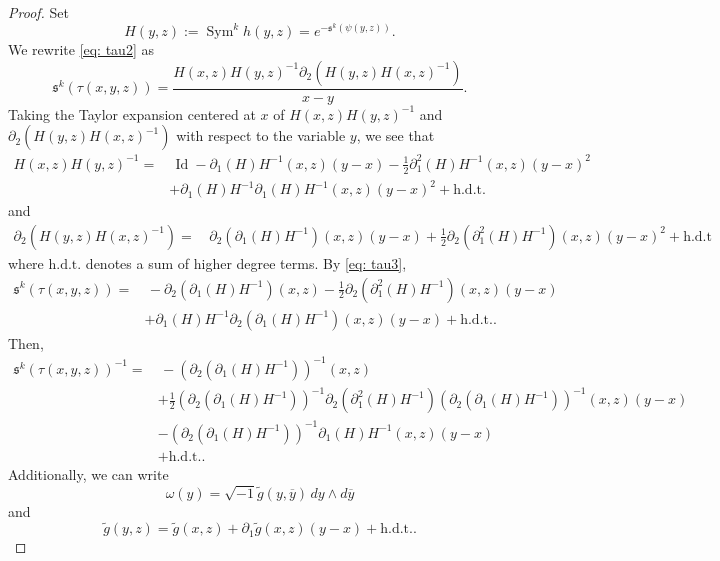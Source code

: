 \documentclass{amsart}
\theoremstyle{definition}
\theoremstyle{remark}
\numberwithin{equation}{section}
\DeclareMathOperator{\Sym}{Sym}
\DeclareMathOperator{\Id}{Id}
\begin{document}
\begin{proof}
Set 
$$
H(y,z) := \Sym^k h(y,z) = e^{-\mathfrak{s}^k(\psi(y,z))}.
$$
We rewrite \eqref{eq: tau2} as
\begin{equation} \label{eq: tau3}
\mathfrak{s}^k( \tau(x,y,z)) = \frac{H(x,z)H(y,z)^{-1} \partial_2 \left ( H(y,z) H(x,z)^{-1}\right )}{x-y}.
\end{equation}
Taking the Taylor expansion centered at $x$ of $H(x,z)H(y,z)^{-1}$ and $\partial_2\left ( H(y,z) H(x,z)^{-1} \right )$ with respect to the variable $y$, we see that
\begin{align*}
H(x,z) H(y,z)^{-1} = & \hspace{2pt} \Id -  \partial_1(H) H^{-1}(x,z) (y-x) -\frac{1}{2}  \partial_1^2 (H)  H^{-1} (x,z) (y-x)^2  \\
    & +  \partial_1 (H) H^{-1} \partial_1(H)H^{-1}(x,z) (y-x)^2 + \text{h.d.t.}
\end{align*}
and
\begin{align*}
\partial_2(H(y,z)H(x,z)^{-1}) = & \hspace{2pt} \partial_2(\partial_1 (H)H^{-1})(x,z)(y-x) + \frac{1}{2} \partial_2 (\partial_1^2 (H)H^{-1})(x,z)(y-x)^2  + \text{h.d.t}
\end{align*}
where $\text{h.d.t.}$ denotes a sum of higher degree terms. By \eqref{eq: tau3},
\begin{align*}
\mathfrak{s}^k(\tau(x,y,z)) = & \hspace{2pt}  - \partial_2(\partial_1 (H) H^{-1})(x,z) - \frac{1}{2} \partial_2(\partial_1^2(H) H^{-1})(x,z)(y-x)  \\
    & + \partial_1(H) H^{-1} \partial_2(\partial_1(H) H^{-1})(x,z)(y-x) + \text{h.d.t.}.
\end{align*}
Then,
\begin{align*}
\mathfrak{s}^k(\tau(x,y,z))^{-1} = & \hspace{2pt}  - (\partial_2(\partial_1 (H)H^{-1}))^{-1} (x,z) \\
    & + \frac{1}{2} (\partial_2(\partial_1 (H)H^{-1}))^{-1}\partial_2(\partial_1^2(H)H^{-1})(\partial_2(\partial_1 (H)H^{-1}))^{-1}(x,z)(y-x)  \\
    & - (\partial_2(\partial_1 (H)H^{-1}))^{-1}\partial_1(H) H^{-1} (x,z)(y-x) \\
    & + \text{h.d.t.}.
\end{align*}
Additionally, we can write 
$$
\omega(y) = \sqrt{-1} \tilde{g}(y,\overline{y}) \,dy \wedge d\overline{y}
$$
and
$$
\tilde{g}(y,z) = \tilde{g}(x,z) + \partial_1 \tilde{g}(x,z)(y-x) + \text{h.d.t.}.
$$




\end{proof}
\end{document}

